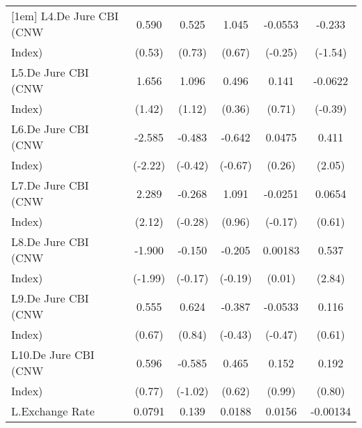 {\begin{tabular}{l*{5}{c}}
[1em]
L4.De Jure CBI (CNW &       0.590         &       0.525         &       1.045         &     -0.0553         &      -0.233         \\
Index)              &      (0.53)         &      (0.73)         &      (0.67)         &     (-0.25)         &     (-1.54)         \\
[1em]
L5.De Jure CBI (CNW &       1.656         &       1.096         &       0.496         &       0.141         &     -0.0622         \\
Index)              &      (1.42)         &      (1.12)         &      (0.36)         &      (0.71)         &     (-0.39)         \\
[1em]
L6.De Jure CBI (CNW &      -2.585\sym{*}  &      -0.483         &      -0.642         &      0.0475         &       0.411\sym{*}  \\
Index)              &     (-2.22)         &     (-0.42)         &     (-0.67)         &      (0.26)         &      (2.05)         \\
[1em]
L7.De Jure CBI (CNW &       2.289\sym{*}  &      -0.268         &       1.091         &     -0.0251         &      0.0654         \\
Index)              &      (2.12)         &     (-0.28)         &      (0.96)         &     (-0.17)         &      (0.61)         \\
[1em]
L8.De Jure CBI (CNW &      -1.900\sym{*}  &      -0.150         &      -0.205         &     0.00183         &       0.537\sym{**} \\
Index)              &     (-1.99)         &     (-0.17)         &     (-0.19)         &      (0.01)         &      (2.84)         \\
[1em]
L9.De Jure CBI (CNW &       0.555         &       0.624         &      -0.387         &     -0.0533         &       0.116         \\
Index)              &      (0.67)         &      (0.84)         &     (-0.43)         &     (-0.47)         &      (0.61)         \\
[1em]
L10.De Jure CBI (CNW&       0.596         &      -0.585         &       0.465         &       0.152         &       0.192         \\
Index)              &      (0.77)         &     (-1.02)         &      (0.62)         &      (0.99)         &      (0.80)         \\
[1em]
L.Exchange Rate     &      0.0791         &       0.139\sym{*}  &      0.0188         &      0.0156         &    -0.00134         \\

\end{tabular}}
